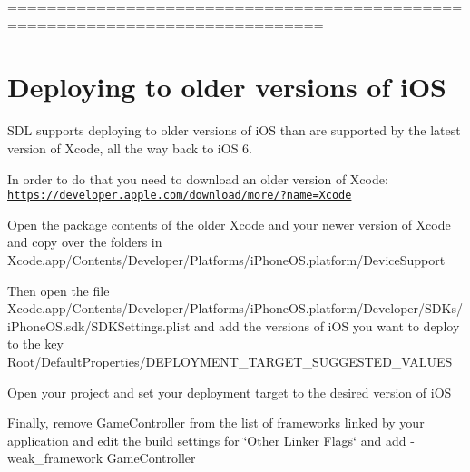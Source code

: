 ============================================================================== \section*{Deploying to older versions of i\+OS }

S\+DL supports deploying to older versions of i\+OS than are supported by the latest version of Xcode, all the way back to i\+OS 6.

In order to do that you need to download an older version of Xcode\+: \href{https://developer.apple.com/download/more/?name=Xcode}{\tt https\+://developer.\+apple.\+com/download/more/?name=\+Xcode}

Open the package contents of the older Xcode and your newer version of Xcode and copy over the folders in Xcode.\+app/\+Contents/\+Developer/\+Platforms/i\+Phone\+OS.platform/\+Device\+Support

Then open the file Xcode.\+app/\+Contents/\+Developer/\+Platforms/i\+Phone\+OS.platform/\+Developer/\+S\+D\+Ks/i\+Phone\+O\+S.\+sdk/\+S\+D\+K\+Settings.plist and add the versions of i\+OS you want to deploy to the key Root/\+Default\+Properties/\+D\+E\+P\+L\+O\+Y\+M\+E\+N\+T\+\_\+\+T\+A\+R\+G\+E\+T\+\_\+\+S\+U\+G\+G\+E\+S\+T\+E\+D\+\_\+\+V\+A\+L\+U\+ES

Open your project and set your deployment target to the desired version of i\+OS

Finally, remove Game\+Controller from the list of frameworks linked by your application and edit the build settings for \char`\"{}\+Other Linker Flags\char`\"{} and add -\/weak\+\_\+framework Game\+Controller 